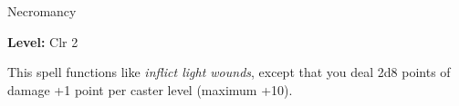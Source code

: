 
Necromancy

\textbf{Level:} Clr 2

This spell functions like \textit{inflict light wounds}, except that you deal 2d8 
points of damage +1 point per caster level (maximum +10).

